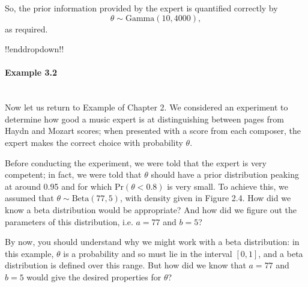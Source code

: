     So, the prior information provided by the expert is quantified correctly by $$\theta\sim\mathrm{Gamma}(10, 4000),$$ as required.

!!enddropdown!!




\paragraph{Example 3.2}{~\\
Now let us return to Example  of Chapter 2.  We considered an experiment to determine how good a music expert is at distinguishing between pages from Haydn and Mozart scores; when presented with a score from each composer, the expert makes the correct choice with probability $\theta$.  

Before conducting the experiment, we were told that the expert is very competent; in fact, we were told that $\theta$ should have a prior distribution peaking at around 0.95 and for which $\text{Pr}(\theta<0.8)$ is very small.  To achieve this, we assumed that $\theta \sim \mathrm{Beta}(77,5)$, with density given in Figure 2.4.  How did we know a beta distribution would be appropriate?  And how did we figure out the parameters of this distribution, i.e. $a=77$ and $b=5$?  

By now, you should understand why we might work with a beta distribution: in this example, $\theta$ is a probability and so must lie in the interval $[0,1]$, and a beta distribution is defined over this range.  But how did we know that $a=77$ and $b=5$ would give the desired properties for $\theta$?  

}
